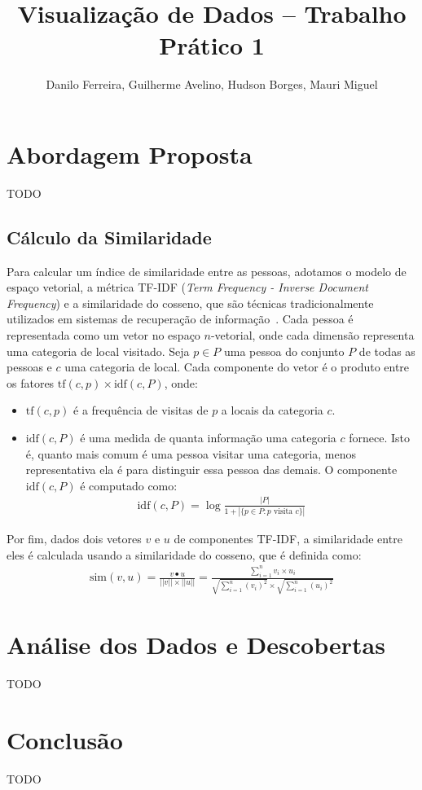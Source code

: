 \documentclass[12pt]{article}
\title{Visualização de Dados -- Trabalho Prático 1}
\author{Danilo Ferreira, Guilherme Avelino, Hudson Borges, Mauri Miguel}
\begin{document}
\maketitle





\section{Abordagem Proposta}

TODO



\subsection{Cálculo da Similaridade}

Para calcular um índice de similaridade entre as pessoas, adotamos o modelo de espaço vetorial, a métrica TF-IDF ({\em Term Frequency - Inverse Document Frequency}) e a similaridade do cosseno, que são técnicas tradicionalmente utilizados em sistemas de recuperação de informação~\cite{manning2008}. Cada pessoa é representada como um vetor no espaço $n$-vetorial, onde cada dimensão representa uma categoria de local visitado. Seja $p \in P$ uma pessoa do conjunto $P$ de todas as pessoas e $c$ uma categoria de local. Cada componente do vetor é o produto entre os fatores $\text{tf}(c, p) \times \text{idf}(c, P)$, onde:
\begin{itemize}
\item $\text{tf}(c, p)$ é a frequência de visitas de $p$ a locais da categoria $c$.
\item $\text{idf}(c, P)$ é uma medida de quanta informação uma categoria $c$ fornece. Isto é, quanto mais comum é uma pessoa visitar uma categoria, menos representativa ela é para distinguir essa pessoa das demais. O componente $\text{idf}(c, P)$ é computado como:
\begin{align*}
\text{idf}(c, P) = \log \frac{|P|}{1 + |\{p \in P : \text{$p$ visita $c$}  \}|}
\end{align*}
\end{itemize}

Por fim, dados dois vetores $v$ e $u$ de componentes TF-IDF, a similaridade entre eles é calculada usando a similaridade do cosseno, que é definida como:
\begin{align*}
\text{sim}(v, u) = \frac{v \bullet u}{||v|| \times ||u||} = \frac{\sum_{i=1}^{n} v_i \times u_i}{\sqrt{\sum_{i=1}^{n} (v_i)^2} \times \sqrt{\sum_{i=1}^{n} (u_i)^2}}
\end{align*}




\section{Análise dos Dados e Descobertas}

TODO



\section{Conclusão}

TODO


\footnotesize


\end{document}
